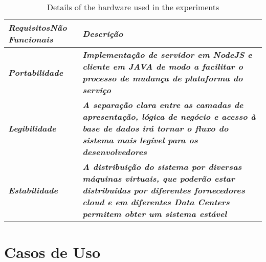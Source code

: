 \documentclass[runningheads]{llncs}
\begin{document}
\begin{table}[htbp]
	\caption{Details of the hardware used in the experiments}
	\begin{center}
		\begin{tabular}{|p{3.5cm}|p{9.5cm}|}
		\hline
			\textbf{\textit{Requisitos\newline Não Funcionais}} & \textbf{\textit{Descrição}}\\ \hline
			\textbf{\textit{Portabilidade}} & \textbf{\textit{Implementação de servidor em NodeJS e cliente em JAVA de modo a facilitar o processo de mudança de plataforma do serviço}} \\ \hline
			\textbf{\textit{Legibilidade}} & \textbf{\textit{A separação clara entre as camadas de apresentação, lógica de negócio e acesso à base de dados irá tornar o fluxo do sistema mais legível para os desenvolvedores}} \\ \hline
			\textbf{\textit{Estabilidade}} & \textbf{\textit{A distribuição do sistema por diversas máquinas virtuais, que poderão estar distribuídas por diferentes fornecedores cloud e em diferentes Data Centers permitem obter um sistema estável}} \\ \hline
	\end{tabular}
	\label{tab1}
	\end{center}
\end{table}
\section{Casos de Uso}
\end{document}
